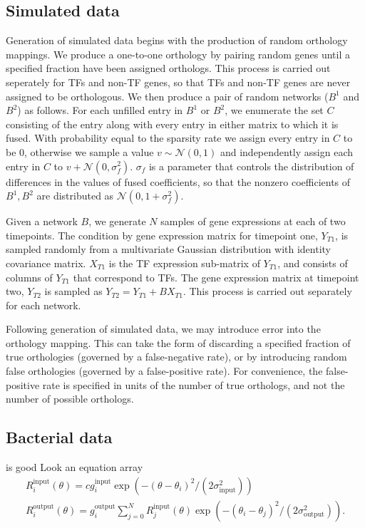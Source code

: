 \documentclass[11pt]{article}
\begin{document}
\subsection{Simulated data}
Generation of simulated data begins with the production of random orthology mappings. We produce a one-to-one orthology by pairing random genes until a specified fraction have been assigned orthologs. This process is carried out seperately for TFs and non-TF genes, so that TFs and non-TF genes are never assigned to be orthologous. We then produce a pair of random networks ($B^1$ and $B^2$) as follows. For each unfilled entry in $B^1$ or $B^2$, we enumerate the set $C$ consisting of the entry along with every entry in either matrix to which it is fused. With probability equal to the sparsity rate we assign every entry in $C$ to be 0, otherwise we sample a value $v \sim \mathcal{N}(0,1)$ and independently assign each entry in $C$ to $v + \mathcal{N}(0, \sigma_f^2)$. $\sigma_f$ is a parameter that controls the distribution of differences in the values of fused coefficients, so that the nonzero coefficients of $B^1, B^2$ are distributed as $\mathcal{N}(0, 1 + \sigma_f^2)$.

Given a network $B$, we generate $N$ samples of gene expressions at each of two timepoints. The condition by gene expression matrix for timepoint one, $Y_{T1}$, is sampled randomly from a multivariate Gaussian distribution with identity covariance matrix. $X_{T1}$ is the TF expression sub-matrix of $Y_{T1}$, and consists of columns of $Y_{T1}$ that correspond to TFs. The gene expression matrix at timepoint two, $Y_{T2}$ is sampled as $Y_{T2} = Y_{T1} + BX_{T1}$. This process is carried out separately for each network. 

Following generation of simulated data, we may introduce error into the orthology mapping. This can take the form of discarding a specified fraction of true orthologies (governed by a false-negative rate), or by introducing random false orthologies (governed by a false-positive rate). For convenience, the false-positive rate is specified in units of the number of true orthologs, and not the number of possible orthologs. 
\subsection{Bacterial data}
is good
Look an equation array
\begin{equation}
\begin{array}{l}
R_i^{\mathrm{input}}(\theta) = c g_i^{\mathrm{input}}\exp(-(\theta - \theta_i)^2 / (2\sigma^2_{\mathrm{input}}))
\\
R_i^{\mathrm{output}}(\theta) = g_i^{\mathrm{output}}\sum_{j=0}^N R_j^{\mathrm{input}}(\theta) \exp(-(\theta_i - \theta_j)^2/(2\sigma^2_{\mathrm{output}})) .
\end{array}
\end{equation}


\end{document}
